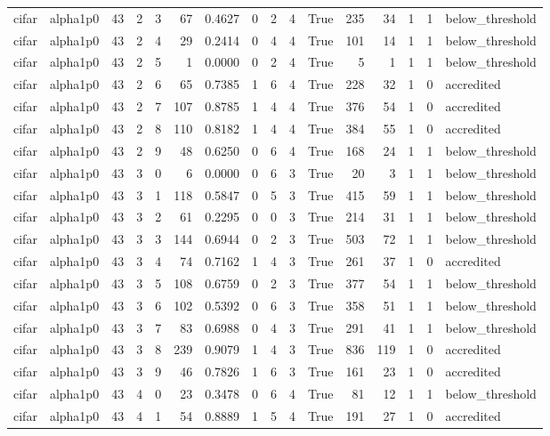 \begin{tabular}{llrrrrrrrrrrrrrl}
cifar & alpha1p0 & 43 & 2 & 3 & 67 & 0.4627 & 0 & 2 & 4 & True & 235 & 34 & 1 & 1 & below\_threshold \\
cifar & alpha1p0 & 43 & 2 & 4 & 29 & 0.2414 & 0 & 4 & 4 & True & 101 & 14 & 1 & 1 & below\_threshold \\
cifar & alpha1p0 & 43 & 2 & 5 & 1 & 0.0000 & 0 & 2 & 4 & True & 5 & 1 & 1 & 1 & below\_threshold \\
cifar & alpha1p0 & 43 & 2 & 6 & 65 & 0.7385 & 1 & 6 & 4 & True & 228 & 32 & 1 & 0 & accredited \\
cifar & alpha1p0 & 43 & 2 & 7 & 107 & 0.8785 & 1 & 4 & 4 & True & 376 & 54 & 1 & 0 & accredited \\
cifar & alpha1p0 & 43 & 2 & 8 & 110 & 0.8182 & 1 & 4 & 4 & True & 384 & 55 & 1 & 0 & accredited \\
cifar & alpha1p0 & 43 & 2 & 9 & 48 & 0.6250 & 0 & 6 & 4 & True & 168 & 24 & 1 & 1 & below\_threshold \\
cifar & alpha1p0 & 43 & 3 & 0 & 6 & 0.0000 & 0 & 6 & 3 & True & 20 & 3 & 1 & 1 & below\_threshold \\
cifar & alpha1p0 & 43 & 3 & 1 & 118 & 0.5847 & 0 & 5 & 3 & True & 415 & 59 & 1 & 1 & below\_threshold \\
cifar & alpha1p0 & 43 & 3 & 2 & 61 & 0.2295 & 0 & 0 & 3 & True & 214 & 31 & 1 & 1 & below\_threshold \\
cifar & alpha1p0 & 43 & 3 & 3 & 144 & 0.6944 & 0 & 2 & 3 & True & 503 & 72 & 1 & 1 & below\_threshold \\
cifar & alpha1p0 & 43 & 3 & 4 & 74 & 0.7162 & 1 & 4 & 3 & True & 261 & 37 & 1 & 0 & accredited \\
cifar & alpha1p0 & 43 & 3 & 5 & 108 & 0.6759 & 0 & 2 & 3 & True & 377 & 54 & 1 & 1 & below\_threshold \\
cifar & alpha1p0 & 43 & 3 & 6 & 102 & 0.5392 & 0 & 6 & 3 & True & 358 & 51 & 1 & 1 & below\_threshold \\
cifar & alpha1p0 & 43 & 3 & 7 & 83 & 0.6988 & 0 & 4 & 3 & True & 291 & 41 & 1 & 1 & below\_threshold \\
cifar & alpha1p0 & 43 & 3 & 8 & 239 & 0.9079 & 1 & 4 & 3 & True & 836 & 119 & 1 & 0 & accredited \\
cifar & alpha1p0 & 43 & 3 & 9 & 46 & 0.7826 & 1 & 6 & 3 & True & 161 & 23 & 1 & 0 & accredited \\
cifar & alpha1p0 & 43 & 4 & 0 & 23 & 0.3478 & 0 & 6 & 4 & True & 81 & 12 & 1 & 1 & below\_threshold \\
cifar & alpha1p0 & 43 & 4 & 1 & 54 & 0.8889 & 1 & 5 & 4 & True & 191 & 27 & 1 & 0 & accredited \\

\end{tabular}
